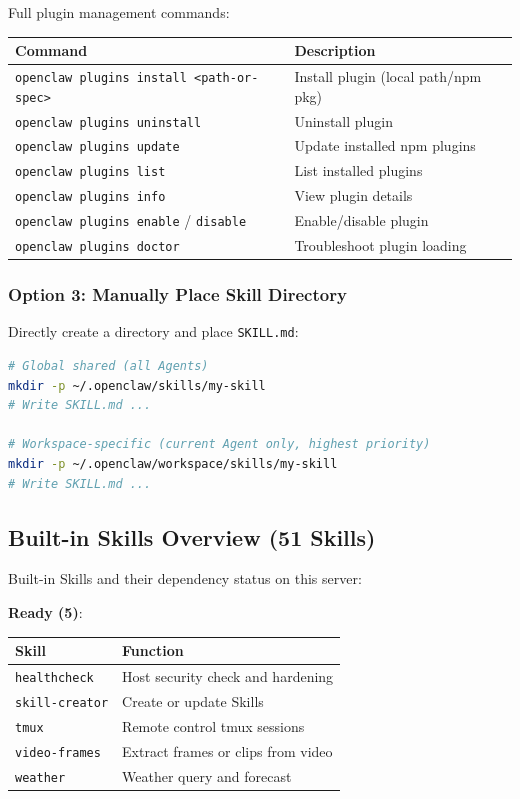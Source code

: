 Full plugin management commands:

\begin{table}[h]
\centering
\small
\begin{tabular}{|l|l|}
\hline
Command & Description \\
\hline
\texttt{openclaw plugins install <path-or-spec>} & Install plugin (local path/npm pkg) \\
\hline
\texttt{openclaw plugins uninstall} & Uninstall plugin \\
\hline
\texttt{openclaw plugins update} & Update installed npm plugins \\
\hline
\texttt{openclaw plugins list} & List installed plugins \\
\hline
\texttt{openclaw plugins info} & View plugin details \\
\hline
\texttt{openclaw plugins enable} / \texttt{disable} & Enable/disable plugin \\
\hline
\texttt{openclaw plugins doctor} & Troubleshoot plugin loading \\
\hline
\end{tabular}
\end{table}

\subsubsection{Option 3: Manually Place Skill Directory}


Directly create a directory and place \texttt{SKILL.md}:

\begin{lstlisting}[language=bash]
# Global shared (all Agents)
mkdir -p ~/.openclaw/skills/my-skill
# Write SKILL.md ...

# Workspace-specific (current Agent only, highest priority)
mkdir -p ~/.openclaw/workspace/skills/my-skill
# Write SKILL.md ...
\end{lstlisting}

\subsection{Built-in Skills Overview (51 Skills)}


Built-in Skills and their dependency status on this server:

\textbf{Ready (5)}:

\begin{table}[h]
\centering
\small
\begin{tabular}{|l|l|}
\hline
Skill & Function \\
\hline
\texttt{healthcheck} & Host security check and hardening \\
\hline
\texttt{skill-creator} & Create or update Skills \\
\hline
\texttt{tmux} & Remote control tmux sessions \\
\hline
\texttt{video-frames} & Extract frames or clips from video \\
\hline
\texttt{weather} & Weather query and forecast \\
\hline
\end{tabular}
\end{table}


